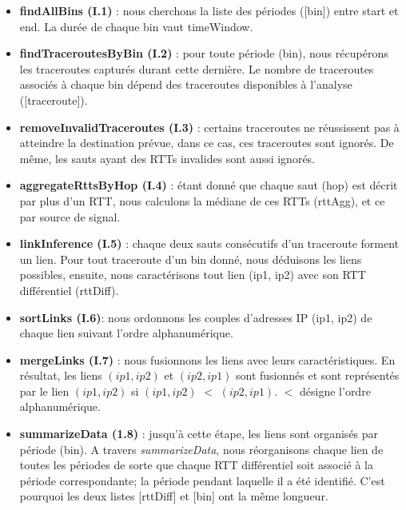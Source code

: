 \begin{itemize}
	\item \textbf{findAllBins (I.1)} : nous cherchons la liste des périodes ({\color{gray}[bin]}) entre  {\color{gray}start} et  {\color{gray}end}. La durée de chaque {\color{gray}bin} vaut  {\color{gray}timeWindow}.
	\item \textbf{findTraceroutesByBin (I.2)} : pour toute période  ({\color{gray}bin}), nous récupérons les traceroutes
	capturés durant cette dernière. Le nombre de traceroutes associés à chaque {\color{gray}bin} dépend
	des traceroutes disponibles à l'analyse  ({\color{gray}[traceroute]}).
	\item \textbf{removeInvalidTraceroutes (I.3)} : certains traceroutes ne réussissent pas à atteindre la destination prévue, dans ce cas, ces traceroutes sont ignorés. De même, les sauts ayant des RTTs invalides
	sont aussi ignorés.
	\item \textbf{aggregateRttsByHop (I.4)} : étant donné que chaque saut  ({\color{gray}hop}) est décrit par plus d'un RTT, nous calculons la médiane de ces RTTs  ({\color{gray}rttAgg}), et ce par source de signal.
	\item \textbf{linkInference (I.5)} : chaque deux sauts consécutifs d'un traceroute forment un lien. Pour
	tout traceroute d'un  {\color{gray}bin} donné, nous déduisons les liens possibles, ensuite, nous caractérisons tout lien  {\color{gray}(ip1, ip2)} avec son RTT différentiel  ({\color{gray}rttDiff}).
	\item \textbf{sortLinks (I.6)}: nous ordonnons les couples d'adresses IP  {\color{gray}(ip1, ip2)} de chaque lien suivant l'ordre alphanumérique. 
	\item \textbf{mergeLinks (I.7)} : nous fusionnons les liens avec leurs caractéristiques. En résultat, les
	liens $ (ip1, ip2) $ et $ (ip2, ip1) $ sont fusionnés et sont représentés par le lien $ (ip1, ip2) $ si $ (ip1, ip2) $ $ < $ $ (ip2, ip1) $. $<$ désigne l'ordre alphanumérique.
	\item \textbf{summarizeData (1.8)} : jusqu'à cette étape, les liens sont organisés par période ({\color{gray}bin}). A travers \textit{summarizeData}, nous réorganisons chaque lien de toutes les périodes de sorte que chaque RTT différentiel soit associé à la période correspondante; la période pendant laquelle il a été identifié. C'est pourquoi les deux listes  {\color{gray}[rttDiff]} et  {\color{gray}[bin]} ont la même longueur.
	
	
	
	
\end{itemize}

